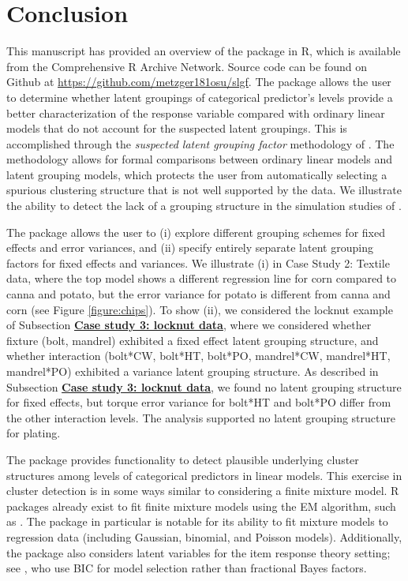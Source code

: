  

\section{Conclusion} \hypertarget{section:conclusion}{}

This manuscript has provided an overview of the  package in R, which is available from the Comprehensive R Archive Network. Source code can be found on Github at \url{https://github.com/metzger181osu/slgf}. The  package allows the user to determine whether latent groupings of categorical predictor's levels provide a better characterization of the response variable compared with ordinary linear models that do not account for the suspected latent groupings. This is accomplished through the \textit{suspected latent grouping factor} methodology of \cite{technometrics_paper}. The methodology allows for formal comparisons between ordinary linear models and latent grouping models, which protects the user from automatically selecting a spurious clustering structure that is not well supported by the data. We illustrate the ability to detect the lack of a grouping structure in the  simulation studies of \citet{technometrics_paper}. 

The  package allows the user to (i) explore different grouping schemes for fixed effects and error variances, and (ii) specify entirely separate latent grouping factors for fixed effects and variances. We illustrate (i) in {Case Study 2: Textile data}, where the top model shows a different regression line for corn compared to canna and potato, but the error variance for potato is different from canna and corn (see Figure \ref{figure:chips}). To show (ii), we considered the locknut example of Subsection \hyperlink{subsection:torque}{\textbf{Case study 3: locknut data}}, where we considered whether fixture (bolt, mandrel) exhibited a fixed effect latent grouping structure, and whether interaction (bolt*CW, bolt*HT, bolt*PO, mandrel*CW, mandrel*HT, mandrel*PO) exhibited a variance latent grouping structure. As described in Subsection \hyperlink{subsection:torque}{\textbf{Case study 3: locknut data}}, we found no latent grouping structure for fixed effects, but torque error variance for bolt*HT and bolt*PO differ from the other interaction levels. The analysis supported no latent grouping structure for plating. 

The  package provides functionality to detect plausible underlying cluster structures among levels of categorical predictors in linear models. This exercise in cluster detection is in some ways similar to considering a finite mixture model. R packages already exist to fit finite mixture models using the EM algorithm, such as  \citep{mixtools}. The  package \citep{flexmix} in particular is notable for its ability to fit mixture models to regression data (including Gaussian, binomial, and Poisson models). Additionally, the package  also considers latent variables for the item response theory setting; see \citet{BARTOLUCCI2014971}, who use BIC for model selection rather than fractional Bayes factors. 

